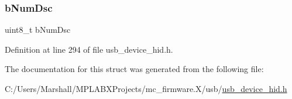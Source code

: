 \subsubsection{\texorpdfstring{bNumDsc}{bNumDsc}}
{\footnotesize\ttfamily uint8\+\_\+t b\+Num\+Dsc}



Definition at line 294 of file usb\+\_\+device\+\_\+hid.\+h.



The documentation for this struct was generated from the following file\+:\begin{DoxyCompactItemize}
\item 
C\+:/\+Users/\+Marshall/\+M\+P\+L\+A\+B\+X\+Projects/mc\+\_\+firmware.\+X/usb/\mbox{\hyperlink{usb__device__hid_8h}{usb\+\_\+device\+\_\+hid.\+h}}\end{DoxyCompactItemize}
